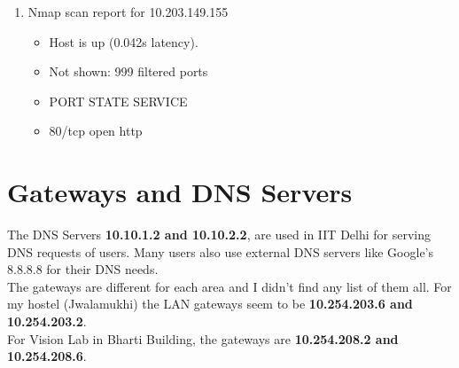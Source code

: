 \documentclass[12pt]{article}
\begin{document}
\begin{enumerate}
 \item Nmap scan report for 10.203.149.155
 \begin{itemize}\item 
Host is up (0.042s latency).\item 
Not shown: 999 filtered ports\item 
PORT   STATE SERVICE\item 
80/tcp open  http
\end{itemize}

\end{enumerate}


\section{Gateways and DNS Servers}

The DNS Servers \textbf{10.10.1.2 and 10.10.2.2}, are used in IIT Delhi for serving DNS requests of users. Many users also use external DNS servers like Google's 8.8.8.8 for their DNS needs.\\

The gateways are different for each area and I didn't find any list of them all. For my hostel (Jwalamukhi) the LAN gateways seem to be \textbf{10.254.203.6 and 10.254.203.2}. \\

For Vision Lab in Bharti Building, the gateways are \textbf{10.254.208.2 and 10.254.208.6}.
\end{document}
